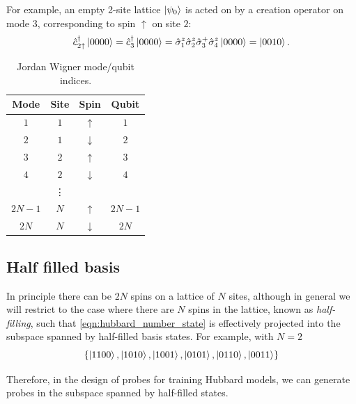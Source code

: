 For example, an empty 2-site lattice $\ket{\psi_0}$ is acted on by a creation operator on mode $3$, corresponding to spin $\uparrow$ on site $2$:
\begin{equation}
\hat{c}^{\dagger}_{2\uparrow} \ket{0000}  = \hat{c}^{\dagger}_{3} \ket{0000} = \hat{\sigma}^z_1 \hat{\sigma}^z_2 \hat{\sigma}^{+}_3 \hat{\sigma}^z_4 \ket{0000} = \ket{0010}. 
\end{equation}

\begin{table}
\begin{center}
    \begin{tabular}{cccc}
        Mode & Site & Spin & Qubit \\
        \hline
        $1$ & $1$ & $\uparrow$ & $1$ \\
        $2$ & $1$ & $\downarrow$ & $2$ \\
        $3$ & $2$ & $\uparrow$ & $3$ \\
        $4$ & $2$ & $\downarrow$ & $4$ \\
         & \vdots &  & \\
        $2N -1$ & $N$ & $\uparrow$ & $2N-1$ \\
        $2N$ & $N$ & $\downarrow$ & $2N$ \\
    \end{tabular}
\end{center}
\caption[Jordan Wigner mode/qubit indices]{Jordan Wigner mode/qubit indices.}
\label{table:jordan_wigner_indices}
\end{table}


\subsection{Half filled basis}
In principle there can be $2N$ spins on a lattice of $N$ sites, 
although in general we will restrict to the case where there are $N$ spins in the lattice, 
known as \emph{half-filling}, such that \cref{eqn:hubbard_number_state} is effectively projected into the subspace 
spanned by half-filled basis states. 
For example, with $N=2$
\begin{equation}
\label{eqn:hubbard_half_filled_basis_states}
\{
    \ket{ 1100 }, \ket{ 1010 }, \ket{ 1001 }, 
    \ket{ 0101 }, \ket{ 0110 }, \ket{ 0011 }
\}
\end{equation}

Therefore, in the design of probes for training Hubbard models, 
we can generate probes in the subspace spanned by half-filled states. 

